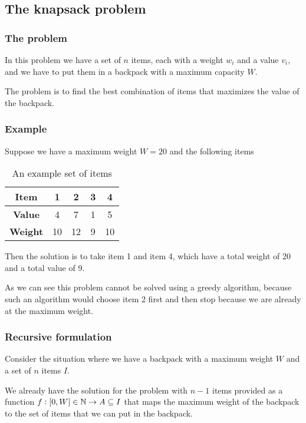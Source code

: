 \documentclass[14pt]{extarticle}
\begin{document}
\subsection{The knapsack problem}

\subsubsection{The problem}

In this problem we have a set of $n$ items, each with a weight $w_i$ and a value $v_i$, and we have to put them in a backpack with a maximum capacity $W$.

The problem is to find the best combination of items that maximizes the value of the backpack.

\subsubsection{Example}

Suppose we have a maximum weight $W = 20$ and the following items

\begin{table}[H]
    \centering
    \begin{tabular}{ |c|c|c|c|c| }
        \hline
        \textbf{Item}   & 1  & 2  & 3 & 4  \\
        \hline
        \textbf{Value}  & 4  & 7  & 1 & 5  \\
        \textbf{Weight} & 10 & 12 & 9 & 10 \\
        \hline
    \end{tabular}

    \label{tab:knapsack_example}
    \caption{An example set of items}
\end{table}

Then the solution is to take item 1 and item 4, which have a total weight of 20 and a total value of 9.

As we can see this problem cannot be solved using a greedy algorithm, because such an algorithm would choose item 2 first and then stop because we are already at the maximum weight.

\subsubsection{Recursive formulation}

Consider the situation where we have a backpack with a maximum weight $W$ and a set of $n$ items $I$.

We already have the solution for the problem with $n-1$ items provided as a function $f : [0, W] \in \mathbb{N} \to A \subseteq I$ that maps the maximum weight of the backpack to the set of items that we can put in the backpack.
\end{document}
